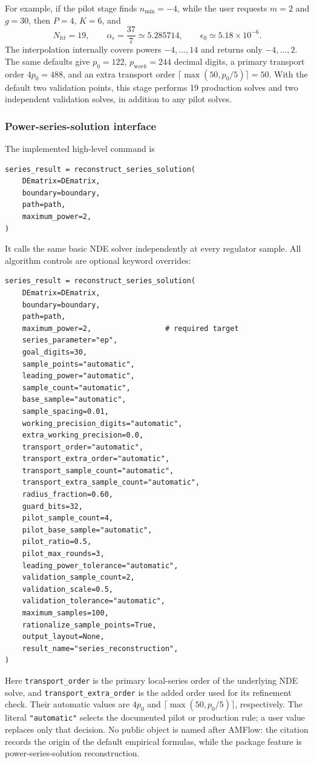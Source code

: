 \documentclass[11pt]{article}
\newcommand{\eps}{\epsilon}
\begin{document}
For example, if the pilot stage finds $n_{\min}=-4$, while the user requests
$m=2$ and $g=30$, then $P=4$, $K=6$, and
\begin{equation}
 N_{\mathrm fit}=19,\qquad
 \alpha_\eps=\frac{37}{7}\simeq5.285714,
 \qquad \eps_0\simeq5.18\times10^{-6}.
\end{equation}
The interpolation internally covers powers $-4,\ldots,14$ and returns only
$-4,\ldots,2$.  The same defaults give $p_0=122$, $p_{\mathrm work}=244$ decimal
digits, a primary transport order $4p_0=488$, and an extra transport order
$\lceil\max(50,p_0/5)\rceil=50$.  With the default two validation points, this stage performs
19 production solves and two independent validation solves, in addition to any pilot solves.

\subsubsection{Power-series-solution interface}

The implemented high-level command is
\begin{verbatim}
series_result = reconstruct_series_solution(
    DEmatrix=DEmatrix,
    boundary=boundary,
    path=path,
    maximum_power=2,
)
\end{verbatim}
It calls the same basic NDE solver independently at every regulator sample.  All algorithm
controls are optional keyword overrides:
\begin{verbatim}
series_result = reconstruct_series_solution(
    DEmatrix=DEmatrix,
    boundary=boundary,
    path=path,
    maximum_power=2,                 # required target
    series_parameter="ep",
    goal_digits=30,
    sample_points="automatic",
    leading_power="automatic",
    sample_count="automatic",
    base_sample="automatic",
    sample_spacing=0.01,
    working_precision_digits="automatic",
    extra_working_precision=0.0,
    transport_order="automatic",
    transport_extra_order="automatic",
    transport_sample_count="automatic",
    transport_extra_sample_count="automatic",
    radius_fraction=0.60,
    guard_bits=32,
    pilot_sample_count=4,
    pilot_base_sample="automatic",
    pilot_ratio=0.5,
    pilot_max_rounds=3,
    leading_power_tolerance="automatic",
    validation_sample_count=2,
    validation_scale=0.5,
    validation_tolerance="automatic",
    maximum_samples=100,
    rationalize_sample_points=True,
    output_layout=None,
    result_name="series_reconstruction",
)
\end{verbatim}
Here \texttt{transport\_order} is the primary local-series order of the underlying NDE solve,
and \texttt{transport\_extra\_order} is the added order used for its refinement check.  Their
automatic values are $4p_0$ and $\lceil\max(50,p_0/5)\rceil$, respectively.  The literal
\texttt{"automatic"} selects the documented pilot or production rule; a user value replaces
only that decision.  No public object is named after AMFlow: the citation records the origin
of the default empirical formulas, while the package feature is power-series-solution
reconstruction.
\end{document}
